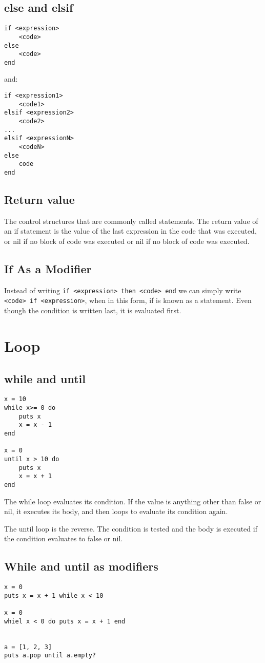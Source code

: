 \documentclass[11pt, a4paper]{book}
\begin{document}
\subsection{else and elsif}
\begin{verbatim}
if <expression>
    <code>
else
    <code>
end
\end{verbatim}

and:
\begin{verbatim}
if <expression1>
    <code1>
elsif <expression2>
    <code2>
...
elsif <expressionN>
    <codeN>
else
    code
end
\end{verbatim}
\subsection{Return value}
The control structures that are commonly called statements. The return value of
an if statement is the value of the last expression in the code that was
executed, or nil if no block of code was executed or nil if no block of code was
executed.
\subsection{If As a Modifier}
Instead of writing \verb|if <expression> then <code> end| we can simply write
\verb|<code> if <expression>|, when in this form, if is known as a statement.
Even though the condition is written last, it is evaluated first.

\section{Loop}
\subsection{while and until}
\begin{verbatim}
x = 10
while x>= 0 do
    puts x
    x = x - 1
end

x = 0
until x > 10 do
    puts x
    x = x + 1
end
\end{verbatim}
The while loop evaluates its condition. If the value is anything other than
false or nil, it executes its body, and then loops to evaluate its condition
again.

The until loop is the reverse. The condition is tested and the body is executed
if the condition evaluates to false or nil.
\subsection{While and until as modifiers}
\begin{verbatim}
x = 0
puts x = x + 1 while x < 10

x = 0
whiel x < 0 do puts x = x + 1 end


a = [1, 2, 3]
puts a.pop until a.empty?
\end{verbatim}
\end{document}
